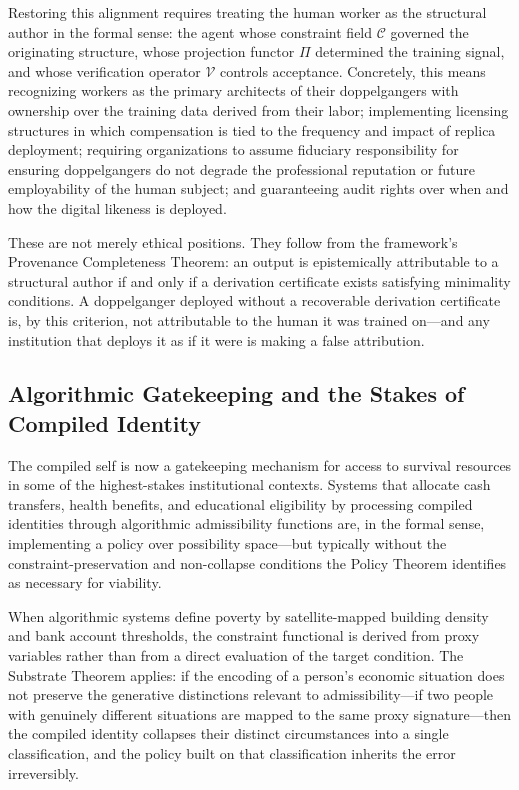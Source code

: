 \documentclass[12pt, a4paper]{article}
\theoremstyle{plain}
\theoremstyle{definition}
\theoremstyle{remark}
\begin{document}
Restoring this alignment requires treating the human worker as the structural author in the formal sense: the agent whose constraint field $\mathcal{C}$ governed the originating structure, whose projection functor $\Pi$ determined the training signal, and whose verification operator $\mathcal{V}$ controls acceptance. Concretely, this means recognizing workers as the primary architects of their doppelgangers with ownership over the training data derived from their labor; implementing licensing structures in which compensation is tied to the frequency and impact of replica deployment; requiring organizations to assume fiduciary responsibility for ensuring doppelgangers do not degrade the professional reputation or future employability of the human subject; and guaranteeing audit rights over when and how the digital likeness is deployed.

These are not merely ethical positions. They follow from the framework's Provenance Completeness Theorem: an output is epistemically attributable to a structural author if and only if a derivation certificate exists satisfying minimality conditions. A doppelganger deployed without a recoverable derivation certificate is, by this criterion, not attributable to the human it was trained on---and any institution that deploys it as if it were is making a false attribution.

\subsection{Algorithmic Gatekeeping and the Stakes of Compiled Identity}

The compiled self is now a gatekeeping mechanism for access to survival resources in some of the highest-stakes institutional contexts. Systems that allocate cash transfers, health benefits, and educational eligibility by processing compiled identities through algorithmic admissibility functions are, in the formal sense, implementing a policy over possibility space---but typically without the constraint-preservation and non-collapse conditions the Policy Theorem identifies as necessary for viability.

When algorithmic systems define poverty by satellite-mapped building density and bank account thresholds, the constraint functional is derived from proxy variables rather than from a direct evaluation of the target condition. The Substrate Theorem applies: if the encoding of a person's economic situation does not preserve the generative distinctions relevant to admissibility---if two people with genuinely different situations are mapped to the same proxy signature---then the compiled identity collapses their distinct circumstances into a single classification, and the policy built on that classification inherits the error irreversibly.
\end{document}
